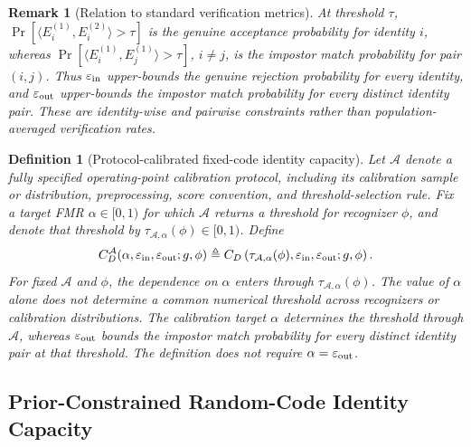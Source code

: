 \documentclass[journal]{IEEEtran}
\newtheorem{definition}[theorem]{Definition}
\newtheorem{remark}[theorem]{Remark}
\begin{document}
\begin{bibunit}
\begin{remark}[Relation to standard verification metrics]
\label{rem:tmr_fmr_relation}
%
At threshold $\tau$, $\Pr \left[ \langle E_i^{(1)},E_i^{(2)}\rangle>\tau \right]$ is the genuine acceptance probability for identity $i$, whereas $\Pr \left[ \langle E_i^{(1)},E_j^{(1)}\rangle>\tau \right]$,  $i\ne j$, is the impostor match probability for pair $(i,j)$. Thus $\varepsilon_{\rm in}$ upper-bounds the genuine rejection probability for every identity, and $\varepsilon_{\rm out}$ upper-bounds the impostor match probability for every distinct identity pair. These are identity-wise and pairwise constraints rather than population-averaged verification rates.
%
\end{remark}


\begin{definition}[Protocol-calibrated fixed-code identity capacity]
\label{def:protocol_calibrated_capacity}
%
Let $\mathcal A$ denote a fully specified operating-point calibration protocol, including its calibration sample or distribution, preprocessing, score convention, and threshold-selection rule. Fix a target FMR
$\alpha\in[0,1)$ for which $\mathcal A$ returns a threshold for recognizer $\phi$, and denote that threshold by $\tau_{\mathcal A,\alpha}(\phi)\in[0,1)$. Define
%
\begin{equation}
C_D^{\mathcal A} (\alpha,\varepsilon_{\rm in},\varepsilon_{\rm out};g,\phi)
\triangleq C_D \left( \tau_{\mathcal A,\alpha}(\phi), \varepsilon_{\rm in}, \varepsilon_{\rm out};
g,\phi \right).
\label{eq:protocol_calibrated_capacity}
\end{equation}
%
For fixed $\mathcal A$ and $\phi$, the dependence on $\alpha$ enters through $\tau_{\mathcal A,\alpha}(\phi)$. The value of $\alpha$ alone does not determine a common numerical threshold across recognizers or calibration distributions. The calibration target $\alpha$ determines the threshold through $\mathcal A$, whereas $\varepsilon_{\rm out}$ bounds the impostor match probability for every distinct identity pair at that threshold. The definition does not require $\alpha=\varepsilon_{\rm out}$.
%
\end{definition}






\subsection{Prior-Constrained Random-Code Identity Capacity}


\end{bibunit}
\end{document}
